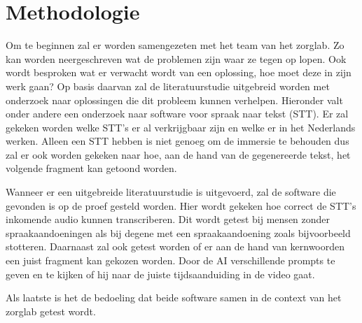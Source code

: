 

\section{Methodologie}%
\label{sec:methodologie}

Om te beginnen zal er worden samengezeten met het team van het zorglab. Zo kan worden neergeschreven wat de problemen zijn waar ze tegen op lopen. Ook wordt besproken wat er verwacht wordt van een oplossing, hoe moet deze in zijn werk gaan? Op basis daarvan zal de literatuurstudie uitgebreid worden met onderzoek naar oplossingen die dit probleem kunnen verhelpen. Hieronder valt onder andere een onderzoek naar software voor spraak naar tekst (STT). Er zal gekeken worden welke STT's er al verkrijgbaar zijn en welke er in het Nederlands werken. Alleen een STT hebben is niet genoeg om de immersie te behouden dus zal er ook worden gekeken naar hoe, aan de hand van de gegenereerde tekst, het volgende fragment kan getoond worden.

Wanneer er een uitgebreide literatuurstudie is uitgevoerd, zal de software die gevonden is op de proef gesteld worden. Hier wordt gekeken hoe correct de STT's inkomende audio kunnen transcriberen. Dit wordt getest bij mensen zonder spraakaandoeningen als bij degene met een spraakaandoening zoals bijvoorbeeld stotteren. Daarnaast zal ook getest worden of er aan de hand van kernwoorden een juist fragment kan gekozen worden. Door de AI verschillende prompts te geven en te kijken of hij naar de juiste tijdsaanduiding in de video gaat.

Als laatste is het de bedoeling dat beide software samen in de context van het zorglab getest wordt.


